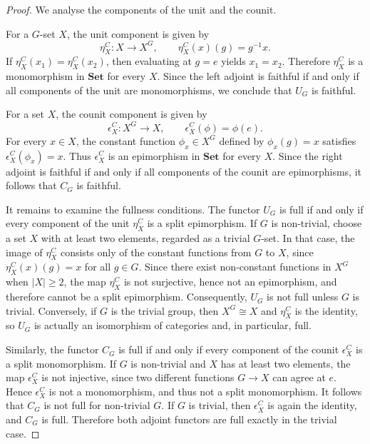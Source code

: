 \documentclass{amsart}
\begin{document}
\begin{proof}
We analyse the components of the unit and the counit.

For a $G$-set $X$, the unit component is given by
\[
\eta^C_X \colon X \longrightarrow X^G, \qquad \eta^C_X(x)(g) = g^{-1}x.
\]
If $\eta^C_X(x_1) = \eta^C_X(x_2)$, then evaluating at $g = e$ yields $x_1 = x_2$. Therefore $\eta^C_X$ is a monomorphism in $\mathbf{Set}$ for every $X$. Since the left adjoint is faithful if and only if all components of the unit are monomorphisms, we conclude that $U_G$ is faithful.

For a set $X$, the counit component is given by
\[
\epsilon^C_X \colon X^G \longrightarrow X, \qquad \epsilon^C_X(\phi) = \phi(e).
\]
For every $x \in X$, the constant function $\phi_x \in X^G$ defined by $\phi_x(g) = x$ satisfies $\epsilon^C_X(\phi_x) = x$. Thus $\epsilon^C_X$ is an epimorphism in $\mathbf{Set}$ for every $X$. Since the right adjoint is faithful if and only if all components of the counit are epimorphisms, it follows that $C_G$ is faithful.

It remains to examine the fullness conditions. The functor $U_G$ is full if and only if every component of the unit $\eta^C_X$ is a split epimorphism. If $G$ is non-trivial, choose a set $X$ with at least two elements, regarded as a trivial $G$-set. In that case, the image of $\eta^C_X$ consists only of the constant functions from $G$ to $X$, since $\eta^C_X(x)(g) = x$ for all $g \in G$. Since there exist non-constant functions in $X^G$ when $|X| \geq 2$, the map $\eta^C_X$ is not surjective, hence not an epimorphism, and therefore cannot be a split epimorphism. Consequently, $U_G$ is not full unless $G$ is trivial. Conversely, if $G$ is the trivial group, then $X^G \cong X$ and $\eta^C_X$ is the identity, so $U_G$ is actually an isomorphism of categories and, in particular, full.

Similarly, the functor $C_G$ is full if and only if every component of the counit $\epsilon^C_X$ is a split monomorphism. If $G$ is non-trivial and $X$ has at least two elements, the map $\epsilon^C_X$ is not injective, since two different functions $G \rightarrow X$ can agree at $e$. Hence $\epsilon^C_X$ is not a monomorphism, and thus not a split monomorphism. It follows that $C_G$ is not full for non-trivial $G$. If $G$ is trivial, then $\epsilon^C_X$ is again the identity, and $C_G$ is full. Therefore both adjoint functors are full exactly in the trivial case.
\end{proof}
\end{document}
